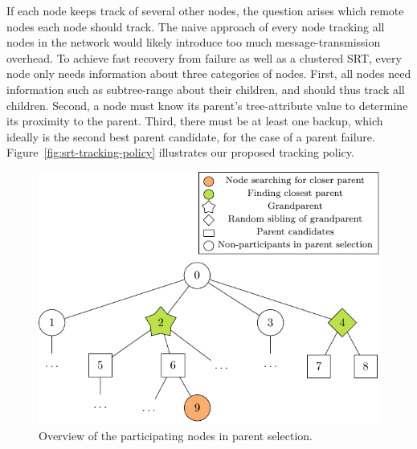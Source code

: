   If each node keeps track of several other nodes, the question arises which remote nodes each node should track. The naive approach of every node tracking all nodes in the network would likely introduce too much message-transmission overhead. To achieve fast recovery from failure as well as a clustered SRT, every node only needs information about three categories of nodes. First, all nodes need information such as subtree-range about their children, and should thus track all children. Second, a node must know its parent’s tree-attribute value to determine its proximity to the parent. Third, there must be at least one backup, which ideally is the second best parent candidate, for the case of a parent failure. Figure~\ref{fig:srt-tracking-policy} illustrates our proposed tracking policy. 
  
  \begin{figure}[t]
    \centering
    \includegraphics[]{img/specific-srts/parent-selection/parent_selection.pdf}
    \caption{Overview of the participating nodes in parent selection.}
    \label{fig:srt-parent-selection}
  \end{figure}

